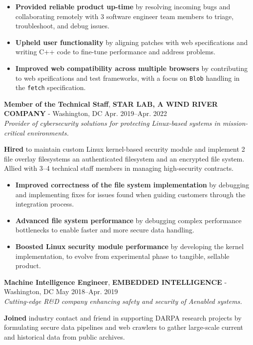 \documentclass[a4paper,skipsamekey,11pt,english]{curve}
\newcommand{\makeWorkHistoryTitle}[5]{
  \begin{tcolorbox}[colback=base1!10,colframe=base1!10,frame hidden]
    {\color{blue}\textbf{#1}}, \textbf{#2} - #3 \hfill #4\\
    {\small\textit{#5}}
  \end{tcolorbox}
}
\begin{document}
  \begin{itemize}
    \item \textbf{Provided reliable product up-time} by resolving incoming bugs
    and collaborating remotely with 3 software engineer team members to triage,
    troubleshoot, and debug issues.
    \item \textbf{Upheld user functionality} by aligning patches with web
    specifications and writing C++ code to fine-tune performance and address
    problems.
    \item \textbf{Improved web compatibility across multiple browsers} by
    contributing to web speifications and test frameworks, with a focus on
    \texttt{Blob} handling in the \texttt{fetch} specification.
  \end{itemize}

  \makeWorkHistoryTitle
    {Member of the Technical Staff}
    {STAR LAB, A WIND RIVER COMPANY}
    {Washington, DC}
    {Apr. 2019–Apr. 2022}
    {
      Provider of cybersecurity solutions for protecting Linux-based systems
      in mission-critical environments.
    }
  \textbf{Hired} to maintain custom Linux kernel-based security module and
  implement 2 file overlay filesystems an authenticated filesystem and an
  encrypted file system. Allied with 3–4 technical staff members in managing
  high-security contracts.

  \begin{itemize}
    \item \textbf{Improved correctness of the file system implementation}
    by debugging and implementing fixes for issues found when guiding
    customers through the integration process.
    \item \textbf{Advanced file system performance} by debugging complex
    performance bottlenecks to enable faster and more secure data handling. 
    \item \textbf{Boosted Linux security module performance} by developing
    the kernel implementation, to evolve from experimental phase to tangible,
    sellable product.
  \end{itemize}

  \makeWorkHistoryTitle
    {Machine Intelligence Engineer}
    {EMBEDDED INTELLIGENCE}
    {Washington, DC}
    {May 2018–Apr. 2019}
    {
      Cutting-edge R\&D company enhancing safety and security of
      A\-enabled systems.
    }
  \textbf{Joined} industry contact and friend in supporting DARPA research
  projects by formulating secure data pipelines and web crawlers to gather
  large-scale current and historical data from public archives.
\end{document}
